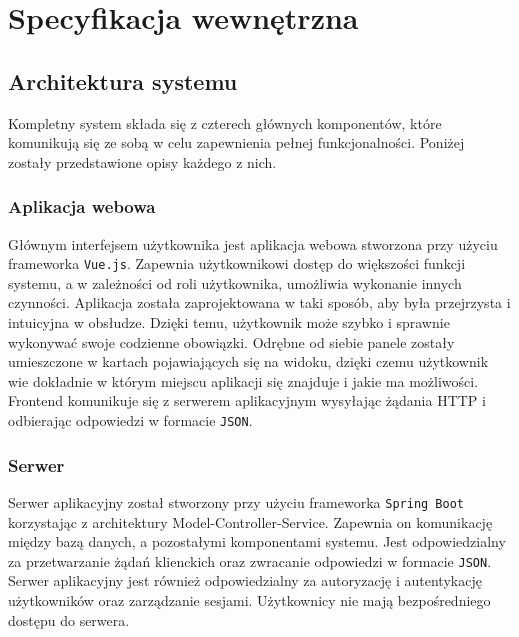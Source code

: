 \chapter{Specyfikacja wewnętrzna}
\label{ch:05}

\section{Architektura systemu}


Kompletny system składa się z czterech głównych komponentów, które komunikują się ze sobą w celu zapewnienia pełnej funkcjonalności. Poniżej zostały przedstawione opisy każdego z nich.

\subsection{Aplikacja webowa}

Głównym interfejsem użytkownika jest aplikacja webowa stworzona przy użyciu frameworka \texttt{Vue.js}. Zapewnia użytkownikowi dostęp do większości funkcji systemu, a w zależności od roli użytkownika, umożliwia wykonanie innych czynności. Aplikacja została zaprojektowana w taki sposób, aby była przejrzysta i intuicyjna w obsłudze. Dzięki temu, użytkownik może szybko i sprawnie wykonywać swoje codzienne obowiązki. Odrębne od siebie panele zostały umieszczone w kartach pojawiających się na widoku, dzięki czemu użytkownik wie dokładnie w którym miejscu aplikacji się znajduje i jakie ma możliwości. Frontend komunikuje się z serwerem aplikacyjnym wysyłając żądania HTTP i odbierając odpowiedzi w formacie \texttt{JSON}.

\subsection{Serwer}

Serwer aplikacyjny został stworzony przy użyciu frameworka \texttt{Spring Boot} korzystając z architektury Model-Controller-Service. Zapewnia on komunikację między bazą danych, a pozostałymi komponentami systemu. Jest odpowiedzialny za przetwarzanie żądań klienckich oraz zwracanie odpowiedzi w formacie \texttt{JSON}. Serwer aplikacyjny jest również odpowiedzialny za autoryzację i autentykację użytkowników oraz zarządzanie sesjami. Użytkownicy nie mają bezpośredniego dostępu do serwera.

